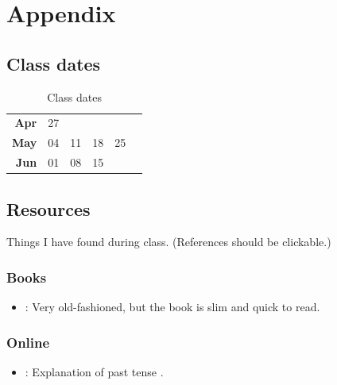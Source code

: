 \chapter{Appendix}

\section*{Class dates}
\begin{table}[ht]
	\centering
	\begin{tabular}{r c c c c c }
      \textbf{Apr} & 27        &           &           &     &    \\
      \textbf{May} & 04        & 11        & 18        & 25  &    \\
      \textbf{Jun} & 01        & 08        & 15        &     &  
	\end{tabular}
	\caption{Class dates}
	\label{tab:tClassDates}
\end{table}

\section*{Resources}
Things I have found during class. (References should be clickable.)

\subsection*{Books}
    \begin{itemize}
        \item \cite{Ragusa}: Very old-fashioned, but the book is slim and quick to read.
    \end{itemize}  

\subsection*{Online}
    \begin{itemize}
        \item \cite{SanFilippo}: Explanation of past tense .
    \end{itemize}  
